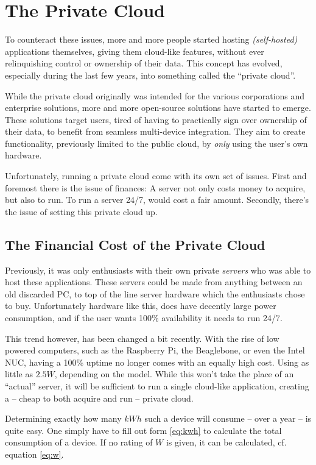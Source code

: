 	\section{The Private Cloud}
		To counteract these issues, more and more people started hosting \emph{(self-hosted)} applications themselves, giving them cloud-like features, without ever relinquishing control or ownership of their data. This concept has evolved, especially during the last few years, into something called the ``private cloud''. 

		While the private cloud originally was intended for the various corporations and enterprise solutions, more and more open-source solutions have started to emerge. These solutions target users, tired of having to practically sign over ownership of their data, to benefit from seamless multi-device integration. They aim to create functionality, previously limited to the public cloud, by \emph{only} using the user's own hardware.

		Unfortunately, running a private cloud come with its own set of issues. First and foremost there is the issue of finances: A server not only costs money to acquire, but also to run. To run a server 24/7, would cost a fair amount. Secondly, there's the issue of setting this private cloud up. 

		\subsection*{The Financial Cost of the Private Cloud}
			\label{sec:privatecloud_cost}
			Previously, it was only enthusiasts with their own private \emph{servers} who was able to host these applications. These servers could be made from anything between an old discarded PC, to top of the line server hardware which the enthusiasts chose to buy. Unfortunately hardware like this, does have decently large power consumption, and if the user wants 100\% availability it needs to run 24/7.

			This trend however, has been changed a bit recently. With the rise of low powered computers, such as the Raspberry Pi, the Beaglebone, or even the Intel NUC, having a 100\% uptime no longer comes with an equally high cost. Using as little as $2.5W$, depending on the model. While this won't take the place of an ``actual'' server, it will be sufficient to run a single cloud-like application, creating a -- cheap to both acquire and run -- private cloud.

			Determining exactly how many $kWh$ such a device will consume -- over a year -- is quite easy. One simply have to fill out form \ref{eq:kwh} to calculate the total consumption of a device. If no rating of $W$ is given, it can be calculated, cf. equation \ref{eq:w}.

